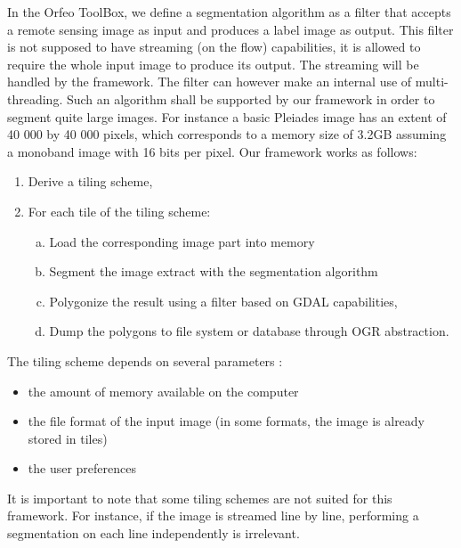 \documentclass{josis}
\begin{document}
In the Orfeo ToolBox, we define a segmentation algorithm as a filter
that accepts a remote sensing image as input and produces a label
image as output. This filter is not supposed to have streaming (on the
flow) capabilities, it is allowed to require the whole input image to
produce its output. The streaming will be handled by the framework. The
filter can however make an internal use of multi-threading. 
Such an algorithm shall be supported by our framework in order to
segment quite large images. For instance a basic Pleiades image 
\cite{} has an extent of 40 000 by 40 000 pixels, which corresponds to
a memory size of 3.2GB assuming a monoband image with 16 bits per pixel.
Our framework works as follows:
\begin{enumerate}[1)]
\item Derive a tiling scheme, 
\item For each tile of the tiling scheme:
\begin{enumerate}[a)]
\item Load the corresponding image part into memory
\item Segment the image extract with the segmentation algorithm
\item Polygonize the result using a filter based on GDAL capabilities,
\item Dump the polygons to file system or database through OGR
      abstraction.
\end{enumerate}
\end{enumerate}

The tiling scheme depends on several parameters :
\begin{itemize}
\item the amount of memory available on the computer
\item the file format of the input image (in some formats, 
the image is already stored in tiles)
\item the user preferences
\end{itemize}
It is important to note that some tiling schemes are not suited for this
framework. For instance, if the image is streamed line by line, performing 
a segmentation on each line independently is irrelevant.
\end{document}
